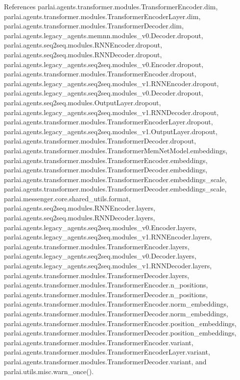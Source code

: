 References parlai.\+agents.\+transformer.\+modules.\+Transformer\+Encoder.\+dim, parlai.\+agents.\+transformer.\+modules.\+Transformer\+Encoder\+Layer.\+dim, parlai.\+agents.\+transformer.\+modules.\+Transformer\+Decoder.\+dim, parlai.\+agents.\+legacy\+\_\+agents.\+memnn.\+modules\+\_\+v0.\+Decoder.\+dropout, parlai.\+agents.\+seq2seq.\+modules.\+R\+N\+N\+Encoder.\+dropout, parlai.\+agents.\+seq2seq.\+modules.\+R\+N\+N\+Decoder.\+dropout, parlai.\+agents.\+legacy\+\_\+agents.\+seq2seq.\+modules\+\_\+v0.\+Encoder.\+dropout, parlai.\+agents.\+transformer.\+modules.\+Transformer\+Encoder.\+dropout, parlai.\+agents.\+legacy\+\_\+agents.\+seq2seq.\+modules\+\_\+v1.\+R\+N\+N\+Encoder.\+dropout, parlai.\+agents.\+legacy\+\_\+agents.\+seq2seq.\+modules\+\_\+v0.\+Decoder.\+dropout, parlai.\+agents.\+seq2seq.\+modules.\+Output\+Layer.\+dropout, parlai.\+agents.\+legacy\+\_\+agents.\+seq2seq.\+modules\+\_\+v1.\+R\+N\+N\+Decoder.\+dropout, parlai.\+agents.\+transformer.\+modules.\+Transformer\+Encoder\+Layer.\+dropout, parlai.\+agents.\+legacy\+\_\+agents.\+seq2seq.\+modules\+\_\+v1.\+Output\+Layer.\+dropout, parlai.\+agents.\+transformer.\+modules.\+Transformer\+Decoder.\+dropout, parlai.\+agents.\+transformer.\+modules.\+Transformer\+Mem\+Net\+Model.\+embeddings, parlai.\+agents.\+transformer.\+modules.\+Transformer\+Encoder.\+embeddings, parlai.\+agents.\+transformer.\+modules.\+Transformer\+Decoder.\+embeddings, parlai.\+agents.\+transformer.\+modules.\+Transformer\+Encoder.\+embeddings\+\_\+scale, parlai.\+agents.\+transformer.\+modules.\+Transformer\+Decoder.\+embeddings\+\_\+scale, parlai.\+messenger.\+core.\+shared\+\_\+utils.\+format, parlai.\+agents.\+seq2seq.\+modules.\+R\+N\+N\+Encoder.\+layers, parlai.\+agents.\+seq2seq.\+modules.\+R\+N\+N\+Decoder.\+layers, parlai.\+agents.\+legacy\+\_\+agents.\+seq2seq.\+modules\+\_\+v0.\+Encoder.\+layers, parlai.\+agents.\+legacy\+\_\+agents.\+seq2seq.\+modules\+\_\+v1.\+R\+N\+N\+Encoder.\+layers, parlai.\+agents.\+transformer.\+modules.\+Transformer\+Encoder.\+layers, parlai.\+agents.\+legacy\+\_\+agents.\+seq2seq.\+modules\+\_\+v0.\+Decoder.\+layers, parlai.\+agents.\+legacy\+\_\+agents.\+seq2seq.\+modules\+\_\+v1.\+R\+N\+N\+Decoder.\+layers, parlai.\+agents.\+transformer.\+modules.\+Transformer\+Decoder.\+layers, parlai.\+agents.\+transformer.\+modules.\+Transformer\+Encoder.\+n\+\_\+positions, parlai.\+agents.\+transformer.\+modules.\+Transformer\+Decoder.\+n\+\_\+positions, parlai.\+agents.\+transformer.\+modules.\+Transformer\+Encoder.\+norm\+\_\+embeddings, parlai.\+agents.\+transformer.\+modules.\+Transformer\+Decoder.\+norm\+\_\+embeddings, parlai.\+agents.\+transformer.\+modules.\+Transformer\+Encoder.\+position\+\_\+embeddings, parlai.\+agents.\+transformer.\+modules.\+Transformer\+Decoder.\+position\+\_\+embeddings, parlai.\+agents.\+transformer.\+modules.\+Transformer\+Encoder.\+variant, parlai.\+agents.\+transformer.\+modules.\+Transformer\+Encoder\+Layer.\+variant, parlai.\+agents.\+transformer.\+modules.\+Transformer\+Decoder.\+variant, and parlai.\+utils.\+misc.\+warn\+\_\+once().



